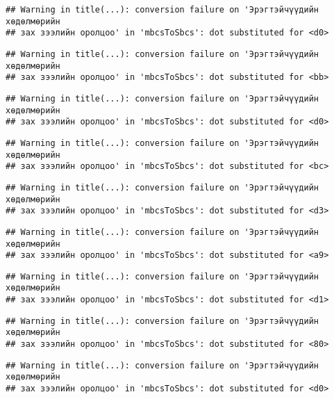 \documentclass[]{article}
\begin{document}
\begin{verbatim}
## Warning in title(...): conversion failure on 'Эрэгтэйчүүдийн хөдөлмөрийн
## зах зээлийн оролцоо' in 'mbcsToSbcs': dot substituted for <d0>
\end{verbatim}

\begin{verbatim}
## Warning in title(...): conversion failure on 'Эрэгтэйчүүдийн хөдөлмөрийн
## зах зээлийн оролцоо' in 'mbcsToSbcs': dot substituted for <bb>
\end{verbatim}

\begin{verbatim}
## Warning in title(...): conversion failure on 'Эрэгтэйчүүдийн хөдөлмөрийн
## зах зээлийн оролцоо' in 'mbcsToSbcs': dot substituted for <d0>
\end{verbatim}

\begin{verbatim}
## Warning in title(...): conversion failure on 'Эрэгтэйчүүдийн хөдөлмөрийн
## зах зээлийн оролцоо' in 'mbcsToSbcs': dot substituted for <bc>
\end{verbatim}

\begin{verbatim}
## Warning in title(...): conversion failure on 'Эрэгтэйчүүдийн хөдөлмөрийн
## зах зээлийн оролцоо' in 'mbcsToSbcs': dot substituted for <d3>
\end{verbatim}

\begin{verbatim}
## Warning in title(...): conversion failure on 'Эрэгтэйчүүдийн хөдөлмөрийн
## зах зээлийн оролцоо' in 'mbcsToSbcs': dot substituted for <a9>
\end{verbatim}

\begin{verbatim}
## Warning in title(...): conversion failure on 'Эрэгтэйчүүдийн хөдөлмөрийн
## зах зээлийн оролцоо' in 'mbcsToSbcs': dot substituted for <d1>
\end{verbatim}

\begin{verbatim}
## Warning in title(...): conversion failure on 'Эрэгтэйчүүдийн хөдөлмөрийн
## зах зээлийн оролцоо' in 'mbcsToSbcs': dot substituted for <80>
\end{verbatim}

\begin{verbatim}
## Warning in title(...): conversion failure on 'Эрэгтэйчүүдийн хөдөлмөрийн
## зах зээлийн оролцоо' in 'mbcsToSbcs': dot substituted for <d0>
\end{verbatim}
\end{document}
